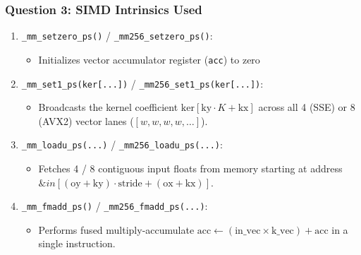 \documentclass[11pt,a4paper]{article}
\begin{document}
\subsubsection{Question 3: SIMD Intrinsics Used}
\begin{enumerate}
    \item \texttt{\_mm\_setzero\_ps()} / \texttt{\_mm256\_setzero\_ps()}:
    \begin{itemize}
        \item Initializes vector accumulator register (\texttt{acc}) to zero
    \end{itemize}
    \item \texttt{\_mm\_set1\_ps(ker[...])} / \texttt{\_mm256\_set1\_ps(ker[...])}:
    \begin{itemize}
        \item Broadcasts the kernel coefficient $\text{ker}[\text{ky} \cdot K + \text{kx}]$ across all 4 (SSE) or 8 (AVX2) vector lanes ($[w, w, w, w, \dots]$).
    \end{itemize}
    \item \texttt{\_mm\_loadu\_ps(...)} / \texttt{\_mm256\_loadu\_ps(...)}:
    \begin{itemize}
        \item Fetches 4 / 8 contiguous input floats from memory starting at address $\&in[(\text{oy}+\text{ky}) \cdot \text{stride} + (\text{ox}+\text{kx})]$.
    \end{itemize}
    \item \texttt{\_mm\_fmadd\_ps()} / \texttt{\_mm256\_fmadd\_ps(...)}:
    \begin{itemize}
        \item Performs fused multiply-accumulate $\text{acc} \leftarrow (\text{in\_vec} \times \text{k\_vec}) + \text{acc}$ in a single instruction.

\end{itemize}
\end{enumerate}
\end{document}
